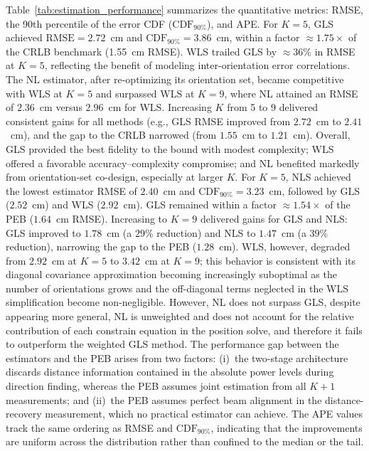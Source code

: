 \documentclass[journal]{IEEEtran}
\newcommand{\added}[1]{{\color{blue}#1}}
\newcommand{\deleted}[1]{{\color{red}#1}}
\begin{document}
Table~\ref{tab:estimation_performance} summarizes the quantitative metrics: RMSE, the 90th percentile of the error CDF (\(\mathrm{CDF}_{90\%}\)), and APE. \deleted{For $K=5$, GLS achieved $\mathrm{RMSE}=2.72$~cm and $\mathrm{CDF}_{90\%}=3.86$~cm, within a factor $\approx1.75\times$ of the CRLB benchmark (1.55~cm RMSE). WLS trailed GLS by $\approx36\%$ in RMSE at $K=5$, reflecting the benefit of modeling inter-orientation error correlations. The NL estimator, after re-optimizing its orientation set, became competitive with WLS at $K=5$ and surpassed WLS at $K=9$, where NL attained an RMSE of $2.36$~cm versus $2.96$~cm for WLS. Increasing $K$ from 5 to 9 delivered consistent gains for all methods (e.g., GLS RMSE improved from $2.72$~cm to $2.41$~cm), and the gap to the CRLB narrowed (from $1.55$~cm to $1.21$~cm). Overall, GLS provided the best fidelity to the bound with modest complexity; WLS offered a favorable accuracy--complexity compromise; and NL benefited markedly from orientation-set co-design, especially at larger $K$.}
\added{For $K{=}5$, NLS achieved the lowest estimator RMSE of $2.40$~cm and $\mathrm{CDF}_{90\%}{=}3.23$~cm, followed by GLS ($2.52$~cm) and WLS ($2.92$~cm). GLS remained within a factor $\approx1.54\times$ of the PEB ($1.64$~cm RMSE). Increasing to $K{=}9$ delivered gains for GLS and NLS: GLS improved to $1.78$~cm (a $29\%$ reduction) and NLS to $1.47$~cm (a $39\%$ reduction), narrowing the gap to the PEB ($1.28$~cm). WLS, however, degraded from $2.92$~cm at $K{=}5$ to $3.42$~cm at $K{=}9$; this behavior is consistent with its diagonal covariance approximation becoming increasingly suboptimal as the number of orientations grows and the off-diagonal terms neglected in the WLS simplification become non-negligible.}
\deleted{However, NL does not surpass GLS, despite appearing more general, NL is unweighted and does not account for the relative contribution of each constrain equation in the position solve, and therefore it fails to outperform the weighted GLS method.}
\added{The performance gap between the estimators and the PEB arises from two factors: (i)~the two-stage architecture discards distance information contained in the absolute power levels during direction finding, whereas the PEB assumes joint estimation from all $K+1$ measurements; and (ii)~the PEB assumes perfect beam alignment in the distance-recovery measurement, which no practical estimator can achieve.}
The APE values track the same ordering as RMSE and \(\mathrm{CDF}_{90\%}\), indicating that the improvements are uniform across the distribution rather than confined to the median or the tail.
\end{document}
